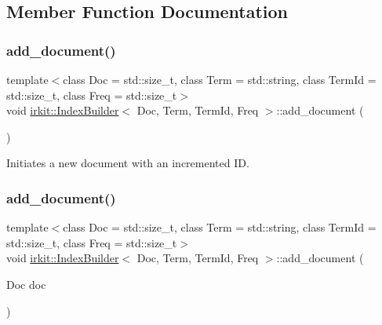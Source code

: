 \subsection{Member Function Documentation}
\mbox{\label{classirkit_1_1IndexBuilder_a8a18c112d48e21a89aefa9a931a536ab}} 
\subsubsection{\texorpdfstring{add\+\_\+document()}{add\_document()}\hspace{0.1cm}{\footnotesize\ttfamily [1/2]}}
{\footnotesize\ttfamily template$<$class Doc  = std\+::size\+\_\+t, class Term  = std\+::string, class Term\+Id  = std\+::size\+\_\+t, class Freq  = std\+::size\+\_\+t$>$ \\
void \hyperlink{classirkit_1_1IndexBuilder}{irkit\+::\+Index\+Builder}$<$ Doc, Term, Term\+Id, Freq $>$\+::add\+\_\+document (\begin{DoxyParamCaption}{ }\end{DoxyParamCaption})\hspace{0.3cm}{\ttfamily [inline]}}



Initiates a new document with an incremented ID. 

\mbox{\label{classirkit_1_1IndexBuilder_a31b062283c9b7203ce4a65a5bd744fae}} 
\subsubsection{\texorpdfstring{add\+\_\+document()}{add\_document()}\hspace{0.1cm}{\footnotesize\ttfamily [2/2]}}
{\footnotesize\ttfamily template$<$class Doc  = std\+::size\+\_\+t, class Term  = std\+::string, class Term\+Id  = std\+::size\+\_\+t, class Freq  = std\+::size\+\_\+t$>$ \\
void \hyperlink{classirkit_1_1IndexBuilder}{irkit\+::\+Index\+Builder}$<$ Doc, Term, Term\+Id, Freq $>$\+::add\+\_\+document (\begin{DoxyParamCaption}\item[{Doc}]{doc }\end{DoxyParamCaption})\hspace{0.3cm}{\ttfamily [inline]}}



